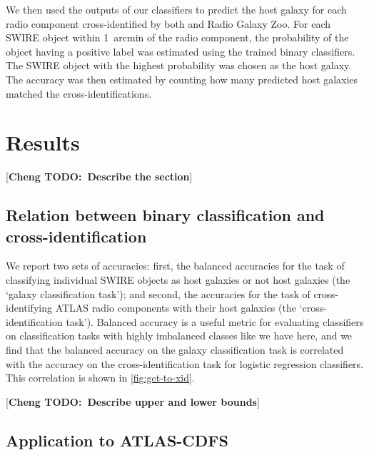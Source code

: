 \documentclass[fleqn,usenatbib,usedcolumn]{mnras}
\newcommand{\cheng}[1]{ {\color{teal}[{\bf Cheng TODO:~{#1}}]} }
\begin{document}
    We then used the outputs of our classifiers to predict the host galaxy for
    each radio component cross-identified by both \citet{norris06} and Radio
    Galaxy Zoo. For each SWIRE object within 1~arcmin of the radio component,
    the probability of the object having a positive label was estimated using
    the trained binary classifiers. The SWIRE object with the highest
    probability was chosen as the host galaxy. The accuracy was then estimated
    by counting how many predicted host galaxies matched the \citet{norris06}
    cross-identifications.

\section{Results}\label{sec:results}

  \cheng{Describe the section}

  \subsection{Relation between binary classification and cross-identification}

  We report two sets of accuracies: first, the balanced accuracies for the
  task of classifying individual SWIRE objects as host galaxies or not host
  galaxies (the `galaxy classification task'); and second, the accuracies
  for the task of cross-identifying ATLAS radio components with their host
  galaxies (the `cross-identification task'). Balanced accuracy is a useful
  metric for evaluating classifiers on classification tasks with highly
  imbalanced classes like we have here, and we find that the balanced
  accuracy on the galaxy classification task is correlated with the accuracy
  on the cross-identification task for logistic regression classifiers. This
  correlation is shown in \autoref{fig:gct-to-xid}.

  \cheng{Describe upper and lower bounds}

  \subsection{Application to ATLAS-CDFS}
\end{document}
